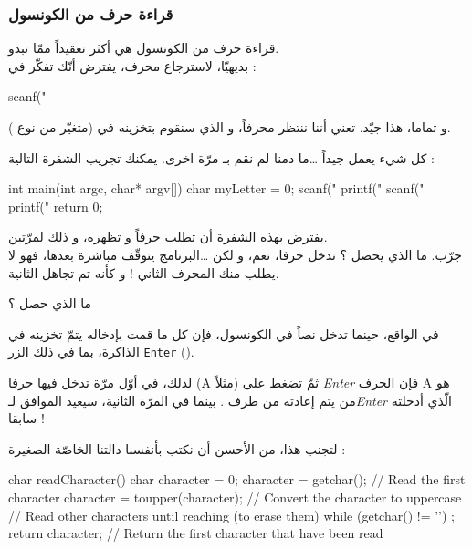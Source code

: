 \subsubsection{قراءة حرف من الكونسول}
قراءة حرف من الكونسول هي أكثر تعقيداً ممّا تبدو.\\
بديهيّا، لاسترجاع محرف، يفترض أنّك تفكّر في :

\begin{Csource}
scanf("%
\end{Csource}

و تماما، هذا جيّد.
تعني أننا ننتظر محرفاً، و الذي سنقوم بتخزينه في
(متغيّر من نوع
).


كل شيء يعمل جيداً \dots ما دمنا لم نقم بـ
مرّة اخرى. يمكنك تجريب الشفرة التالية :

\begin{Csource}
int main(int argc, char* argv[])
{
 	char myLetter = 0;
 	scanf("%
 	printf("%
 	scanf("%
 	printf("%
 	return 0;
}
\end{Csource}

يفترض بهذه الشفرة أن تطلب حرفاً و تظهره، و ذلك لمرّتين.\\
جرّب. ما الذي يحصل ؟ تدخل حرفا، نعم، و لكن \dots البرنامج يتوقّف مباشرة بعدها، فهو لا يطلب منك المحرف الثاني ! و كأنه تم تجاهل
الثانية.

\begin{question}
ما الذي حصل ؟
\end{question}

في الواقع، حينما تدخل نصاً في الكونسول، فإن كل ما قمت بإدخاله يتمّ تخزينه في الذاكرة، بما في ذلك الزر
\texttt{Enter}
().

لذلك، في أوّل مرّة تدخل فيها حرفا
(\textenglish{A}
مثلاً) ثمّ تضغط على
\textit{\textenglish{Enter}}
فإن الحرف
\textenglish{A}
هو من يتم إعادته من طرف
.
بينما في المرّة الثانية،
سيعيد
الموافق لـ\textit{\textenglish{Enter}}
الّذي أدخلته سابقا !

لتجنب هذا، من الأحسن أن نكتب بأنفسنا دالتنا الخاصّة الصغيرة
 :

\begin{Csource}
char readCharacter()
{
  char character = 0;
  character = getchar(); // Read the first character
  character = toupper(character); // Convert the character to uppercase
  // Read other characters until reaching \n (to erase them)
  while (getchar() != '\n') ;
  return character; // Return the first character that have been read
}
\end{Csource}

